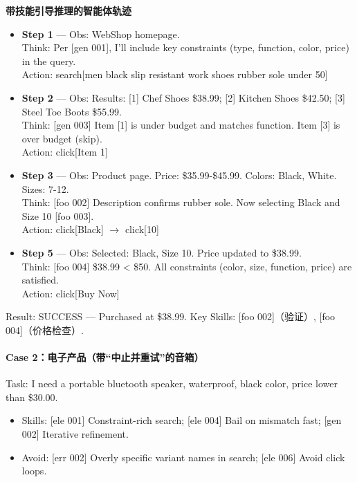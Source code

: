 \documentclass[11pt,UTF8,fontset=fandol]{ctexart}
\begin{document}
\textbf{带技能引导推理的智能体轨迹}
\begin{itemize}[leftmargin=1.5em,itemsep=0.2em]
\item \textbf{Step 1} — Obs: WebShop homepage.\\
  Think: Per [gen 001], I'll include key constraints (type, function, color, price) in the query.\\
  Action: search[men black slip resistant work shoes rubber sole under 50]
\item \textbf{Step 2} — Obs: Results: [1] Chef Shoes \$38.99; [2] Kitchen Shoes \$42.50; [3] Steel Toe Boots \$55.99.\\
  Think: [gen 003] Item [1] is under budget and matches function. Item [3] is over budget (skip).\\
  Action: click[Item 1]
\item \textbf{Step 3} — Obs: Product page. Price: \$35.99-\$45.99. Colors: Black, White. Sizes: 7-12.\\
  Think: [foo 002] Description confirms rubber sole. Now selecting Black and Size 10 [foo 003].\\
  Action: click[Black] $\rightarrow$ click[10]
\item \textbf{Step 5} — Obs: Selected: Black, Size 10. Price updated to \$38.99.\\
  Think: [foo 004] \$38.99 < \$50. All constraints (color, size, function, price) are satisfied.\\
  Action: click[Buy Now]
\end{itemize}
Result: SUCCESS — Purchased at \$38.99. Key Skills: [foo 002]（验证）, [foo 004]（价格检查）.

\paragraph{Case 2：电子产品（带“中止并重试”的音箱）}
Task: I need a portable bluetooth speaker, waterproof, black color, price lower than \$30.00.
\begin{itemize}[leftmargin=1.5em,itemsep=0.1em]
\item Skills: [ele 001] Constraint-rich search; [ele 004] Bail on mismatch fast; [gen 002] Iterative refinement.
\item Avoid: [err 002] Overly specific variant names in search; [ele 006] Avoid click loops.
\end{itemize}
\end{document}
